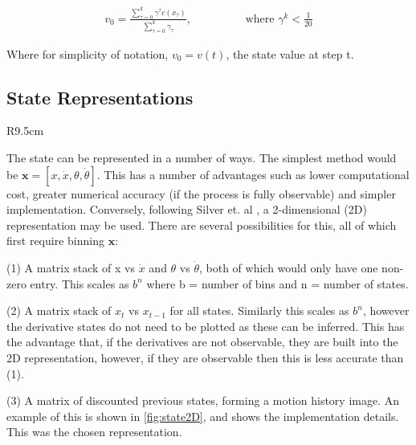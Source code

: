 \documentclass[../main.tex]{subfiles}
\begin{document}
\begin{align}
   v_0 = \frac{\sum_{\tau=0}^{k} \gamma^\tau c(x_\tau ) }{\sum_{\tau = 0}^k \gamma_\tau}, \hspace{2cm} \text{where } \gamma^k < \frac{1}{20}
\end{align}

Where for simplicity of notation, $v_0 = v(t)$, the state value at step t.

\subsection{State Representations}

\begin{wrapfigure}{R}{9.5cm}
   \label{fig:state2D}
\end{wrapfigure}

The state can be represented in a number of ways. The simplest method would be $\boldsymbol{x} = [x, \dot{x}, \theta, \dot{\theta}]$. This has a number of advantages such as lower computational cost, greater numerical accuracy (if the process is fully observable) and simpler implementation. Conversely, following Silver et. al \cite{AlphaZero}, a 2-dimensional (2D) representation may be used. There are several possibilities for this, all of which first require binning $\boldsymbol{x}$:

(1) A matrix stack of x vs $\dot{x}$ and $\theta$ vs $\dot{\theta}$, both of which would only have one non-zero entry. This scales as $b^n$ where b = number of bins and n = number of states.

(2) A matrix stack of $x_t$ vs $x_{t-1}$ for all states. Similarly this scales as $b^n$, however the derivative states do not need to be plotted as these can be inferred. This has the advantage that, if the derivatives are not observable, they are built into the 2D representation, however, if they are observable then this is less accurate than (1).

(3) A matrix of discounted previous states, forming a motion history image. An example of this is shown in \cref{fig:state2D},  and  shows the implementation details. This was the chosen representation.
\end{document}
